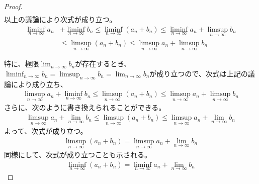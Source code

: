 \documentclass[dvipdfmx]{jsarticle}
\begin{document}
\begin{proof}
\begin{align*}
\end{align*}
以上の議論により次式が成り立つ。
\begin{align*}
\liminf_{n \rightarrow \infty}a_{n} &+ \liminf_{n \rightarrow \infty}b_{n} \leq \liminf_{n \rightarrow \infty}\left( a_{n} + b_{n} \right) \leq \liminf_{n \rightarrow \infty}a_{n} + \limsup_{n \rightarrow \infty}b_{n}\\
&\leq \limsup_{n \rightarrow \infty}\left( a_{n} + b_{n} \right) \leq \limsup_{n \rightarrow \infty}a_{n} + \limsup_{n \rightarrow \infty}b_{n}
\end{align*}\par
特に、極限$\lim_{n \rightarrow \infty}b_{n}$が存在するとき、$\liminf_{n \rightarrow \infty}b_{n} = \limsup_{n \rightarrow \infty}b_{n} = \lim_{n \rightarrow \infty}b_{n}$が成り立つので、次式は上記の議論により成り立ち、
\begin{align*}
\limsup_{n \rightarrow \infty}a_{n} + \liminf_{n \rightarrow \infty}b_{n} \leq \limsup_{n \rightarrow \infty}\left( a_{n} + b_{n} \right) \leq \limsup_{n \rightarrow \infty}a_{n} + \limsup_{n \rightarrow \infty}b_{n}
\end{align*}
さらに、次のように書き換えられることができる。
\begin{align*}
\limsup_{n \rightarrow \infty}a_{n} + \lim_{n \rightarrow \infty}b_{n} \leq \limsup_{n \rightarrow \infty}\left( a_{n} + b_{n} \right) \leq \limsup_{n \rightarrow \infty}a_{n} + \lim_{n \rightarrow \infty}b_{n}
\end{align*}
よって、次式が成り立つ。
\begin{align*}
\limsup_{n \rightarrow \infty}\left( a_{n} + b_{n} \right) = \limsup_{n \rightarrow \infty}a_{n} + \lim_{n \rightarrow \infty}b_{n}
\end{align*}
同様にして、次式が成り立つことも示される。
\begin{align*}
\liminf_{n \rightarrow \infty}\left( a_{n} + b_{n} \right) = \liminf_{n \rightarrow \infty}a_{n} + \lim_{n \rightarrow \infty}b_{n}
\end{align*}
\end{proof}
\end{document}
